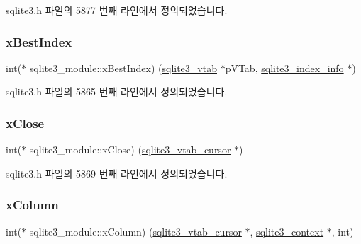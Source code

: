 sqlite3.\+h 파일의 5877 번째 라인에서 정의되었습니다.

\mbox{\label{structsqlite3__module_aad92b2cd56253baaeac656d7693ce4af}} 
\subsubsection{\texorpdfstring{x\+Best\+Index}{xBestIndex}}
{\footnotesize\ttfamily int($\ast$ sqlite3\+\_\+module\+::x\+Best\+Index) (\hyperlink{structsqlite3__vtab}{sqlite3\+\_\+vtab} $\ast$p\+V\+Tab, \hyperlink{structsqlite3__index__info}{sqlite3\+\_\+index\+\_\+info} $\ast$)}



sqlite3.\+h 파일의 5865 번째 라인에서 정의되었습니다.

\mbox{\label{structsqlite3__module_acc6c4d6d41f3d056e297eea9725b887c}} 
\subsubsection{\texorpdfstring{x\+Close}{xClose}}
{\footnotesize\ttfamily int($\ast$ sqlite3\+\_\+module\+::x\+Close) (\hyperlink{structsqlite3__vtab__cursor}{sqlite3\+\_\+vtab\+\_\+cursor} $\ast$)}



sqlite3.\+h 파일의 5869 번째 라인에서 정의되었습니다.

\mbox{\label{structsqlite3__module_a7cde490d5d06e19b90d768b90991f4a6}} 
\subsubsection{\texorpdfstring{x\+Column}{xColumn}}
{\footnotesize\ttfamily int($\ast$ sqlite3\+\_\+module\+::x\+Column) (\hyperlink{structsqlite3__vtab__cursor}{sqlite3\+\_\+vtab\+\_\+cursor} $\ast$, \hyperlink{sqlite3_8h_a3b519553ffec8fc42b2356f5b1ebdc57}{sqlite3\+\_\+context} $\ast$, int)}



